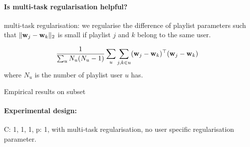 \paragraph{Is multi-task regularisation helpful?}

multi-task regularisation: we regularise the difference of playlist parameters 
such that $\|\mathbf{w}_j - \mathbf{w}_k\|_2$ is small if playlist $j$ and $k$ belong to the same user.

\begin{equation*}
\frac{1}{\sum_u N_u (N_u - 1)} \sum_u \sum_{j, k \in u} (\mathbf{w}_j - \mathbf{w}_k)^\top (\mathbf{w}_j - \mathbf{w}_k)
\end{equation*}
where $N_u$ is the number of playlist user $u$ has.

Empirical results on subset \\

\paragraph{Experimental design:}
C: 1, 1, 1, p: 1, with multi-task regularisation, no user specific regularisation parameter.


